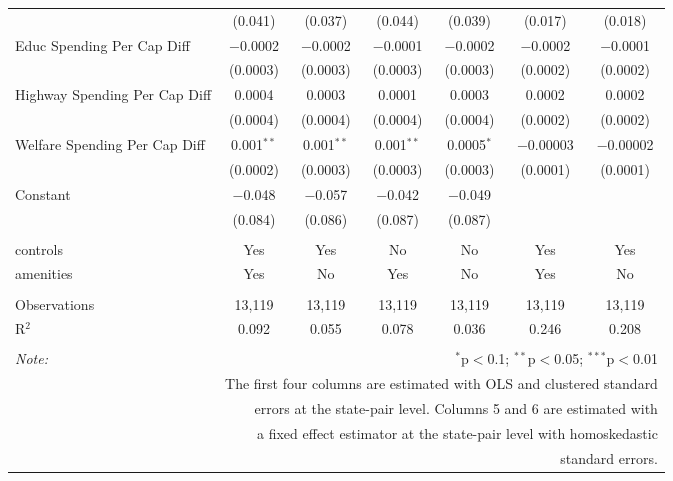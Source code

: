 \begin{table}[!htbp]
\begin{tabular}{@{\extracolsep{5pt}}lcccccc}
  & (0.041) & (0.037) & (0.044) & (0.039) & (0.017) & (0.018) \\ 
  Educ Spending Per Cap Diff & $-$0.0002 & $-$0.0002 & $-$0.0001 & $-$0.0002 & $-$0.0002 & $-$0.0001 \\ 
  & (0.0003) & (0.0003) & (0.0003) & (0.0003) & (0.0002) & (0.0002) \\ 
  Highway Spending Per Cap Diff & 0.0004 & 0.0003 & 0.0001 & 0.0003 & 0.0002 & 0.0002 \\ 
  & (0.0004) & (0.0004) & (0.0004) & (0.0004) & (0.0002) & (0.0002) \\ 
  Welfare Spending Per Cap Diff & 0.001$^{**}$ & 0.001$^{**}$ & 0.001$^{**}$ & 0.0005$^{*}$ & $-$0.00003 & $-$0.00002 \\ 
  & (0.0002) & (0.0003) & (0.0003) & (0.0003) & (0.0001) & (0.0001) \\ 
  Constant & $-$0.048 & $-$0.057 & $-$0.042 & $-$0.049 &  &  \\ 
  & (0.084) & (0.086) & (0.087) & (0.087) &  &  \\ 
 \hline \\[-1.8ex] 
controls & Yes & Yes & No & No & Yes & Yes \\ 
amenities & Yes & No & Yes & No & Yes & No \\ 
\hline \\[-1.8ex] 
Observations & 13,119 & 13,119 & 13,119 & 13,119 & 13,119 & 13,119 \\ 
R$^{2}$ & 0.092 & 0.055 & 0.078 & 0.036 & 0.246 & 0.208 \\ 
\hline 
\hline \\[-1.8ex] 
\textit{Note:}  & \multicolumn{6}{r}{$^{*}$p$<$0.1; $^{**}$p$<$0.05; $^{***}$p$<$0.01} \\ 
 & \multicolumn{6}{r}{The first four columns are estimated with OLS and clustered standard} \\ 
 & \multicolumn{6}{r}{ errors at the state-pair level. Columns 5 and 6 are estimated with} \\ 
 & \multicolumn{6}{r}{a fixed effect estimator at the state-pair level with homoskedastic} \\ 
 & \multicolumn{6}{r}{standard errors.} \\ 
\end{tabular} 
\end{table} 
